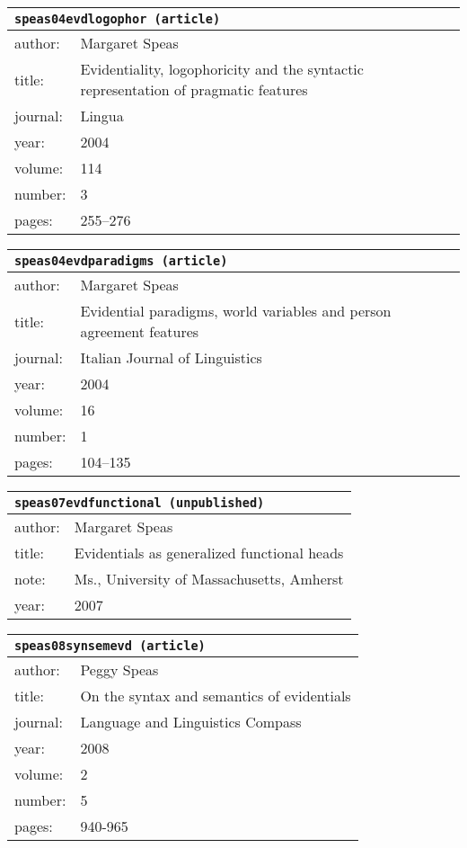 \documentclass{article}
\begin{document}
\bigskip

\begin{tabular}{p{}p{}}
\multicolumn{2}{l}{\texttt{speas04evdlogophor (article)}}\\
\hline
author: & Margaret Speas\\
title: &  Evidentiality, logophoricity and the syntactic representation of pragmatic features\\
journal: & Lingua\\
year: & 2004\\
volume: & 114\\
number: & 3\\
pages: & 255--276\\
\end{tabular}

\bigskip

\begin{tabular}{p{}p{}}
\multicolumn{2}{l}{\texttt{speas04evdparadigms (article)}}\\
\hline
author: & Margaret Speas\\
title: & Evidential paradigms, world variables and person agreement features\\
journal: & Italian Journal of Linguistics\\
year: & 2004\\
volume: & 16\\
number: & 1\\
pages: & 104--135\\
\end{tabular}

\bigskip

\begin{tabular}{p{}p{}}
\multicolumn{2}{l}{\texttt{speas07evdfunctional (unpublished)}}\\
\hline
author: & Margaret Speas\\
title: & Evidentials as generalized functional heads\\
note: & \textsc{M}s., University of Massachusetts, Amherst\\
year: & 2007\\
\end{tabular}

\bigskip

\begin{tabular}{p{}p{}}
\multicolumn{2}{l}{\texttt{speas08synsemevd (article)}}\\
\hline
author: & Peggy Speas\\
title: & On the syntax and semantics of evidentials\\
journal: & Language and Linguistics Compass\\
year: & 2008\\
volume: & 2\\
number: & 5\\
pages: & 940-965\\
\end{tabular}
\end{document}
